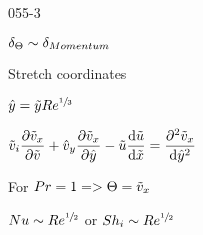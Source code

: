 \begin{mitframe}{055-3}
 \begin{listone}
	\item $\blthick_{\dimltemp}\sim\blthick_{Momentum}$
    \item Stretch coordinates
    	\begin{listtwo}
        	\item $\hat{y}=\tilde{y}\reynolds^{\sfrac{1}{3}}$
            \item $\tilde{\vvel}_{\state}\dfrac{\partial{\tilde{\vvel}_{\disp}}}{\partial\tilde{\vvel}}+\hat{\vvel}_y\dfrac{\partial\tilde{\vvel}_{\disp}}{\partial\hat{y}}-\tilde{\forcepot}\dfrac{\mathrm{d}\tilde{\forcepot}}{\mathrm{d}\tilde{\disp}}=\dfrac{\partial^2\tilde{\vvel}_{\disp}}{\mathrm{d}\hat{y}^2}$
            
            \item For $\prandtl=1=>\dimltemp=\tilde{\vvel}_{\disp}$
                   \end{listtwo}
\item $\nusselt\sim\reynolds^{\sfrac{1}{2}}$ or $\sherwood_{\state}\sim\reynolds^{\sfrac{1}{2}}$
\end{listone}      
        

\end{mitframe}